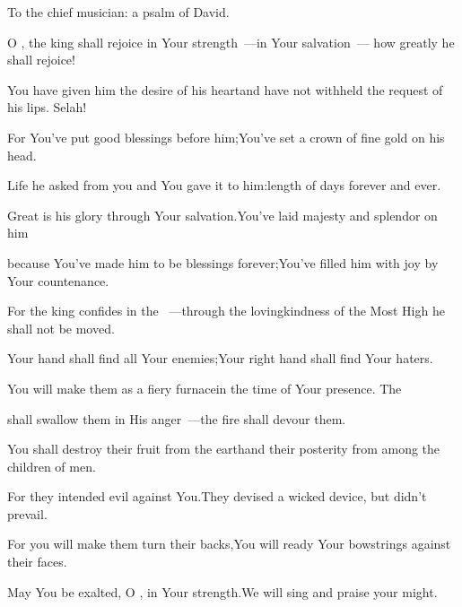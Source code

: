
\begin{inparaenum}
  \noindent{} To the chief musician: a psalm of David.\smallskip%

  \pa{} O \lord, the king shall rejoice in Your strength~---\pa{}in Your salvation~--- how greatly he shall rejoice!%

  \pa{} You have given him the desire of his heart\pa{}and have not withheld the request of his lips. Selah!%

  \pb{} For You've put good blessings before him;\pa{}You've set a crown of fine gold on his head.%

   Life he asked from you and You gave it to him:\pa{}length of days forever and ever.%

  \pa{} Great is his glory through Your salvation.\pa{}You've laid majesty and splendor on him%

  \pa{} because You've made him to be blessings forever;\pa{}You've filled him with joy by Your countenance.%

  \pb{} For the king confides in the \lord~---\pa{}through the lovingkindness of the Most High he shall not be moved.%

  \pa{} Your hand shall find all Your enemies;\pa{}Your right hand shall find Your haters.%

  \pa{} You will make them as a fiery furnace\pa{}in the time of Your presence. The \lord%

  \pb{}shall swallow them in His anger~---\pa{}the fire shall devour them.%

  \pa{} You shall destroy their fruit from the earth\pa{}and their posterity from among the children of men.%

  \pb{} For they intended evil against You.\pa{}They devised a wicked device, but didn't prevail.%

  \pa{} For you will make them turn their backs,\pa{}You will ready Your bowstrings against their faces.%

  \pa{} May You be exalted, O \lord, in Your strength.\pa{}We will sing and praise your might.%
\end{inparaenum}
